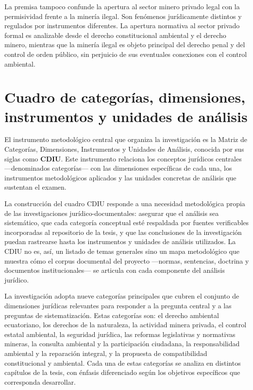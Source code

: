 La premisa tampoco confunde la apertura al sector minero privado legal con la permisividad frente a la minería ilegal. Son fenómenos jurídicamente distintos y regulados por instrumentos diferentes. La apertura normativa al sector privado formal es analizable desde el derecho constitucional ambiental y el derecho minero, mientras que la minería ilegal es objeto principal del derecho penal y del control de orden público, sin perjuicio de sus eventuales conexiones con el control ambiental.

\section{Cuadro de categorías, dimensiones, instrumentos
         y unidades de análisis}

El instrumento metodológico central que organiza la investigación es la Matriz de Categorías, Dimensiones, Instrumentos y Unidades de Análisis, conocida por sus siglas como \textbf{CDIU}. Este instrumento relaciona los conceptos jurídicos centrales ---denominados categorías--- con las dimensiones específicas de cada una, los instrumentos metodológicos aplicados y las unidades concretas de análisis que sustentan el examen.

La construcción del cuadro CDIU responde a una necesidad metodológica propia de las investigaciones jurídico-documentales: asegurar que el análisis sea sistemático, que cada categoría conceptual esté respaldada por fuentes verificables incorporadas al repositorio de la tesis, y que las conclusiones de la investigación puedan rastrearse hasta los instrumentos y unidades de análisis utilizados. La CDIU no es, así, un listado de temas generales sino un mapa metodológico que muestra cómo el corpus documental del proyecto ---normas, sentencias, doctrina y documentos institucionales--- se articula con cada componente del análisis jurídico.

La investigación adopta nueve categorías principales que cubren el conjunto de dimensiones jurídicas relevantes para responder a la pregunta central y a las preguntas de sistematización. Estas categorías son: el derecho ambiental ecuatoriano, los derechos de la naturaleza, la actividad minera privada, el control estatal ambiental, la seguridad jurídica, las reformas legislativas y normativas mineras, la consulta ambiental y la participación ciudadana, la responsabilidad ambiental y la reparación integral, y la propuesta de compatibilidad constitucional y ambiental. Cada una de estas categorías se analiza en distintos capítulos de la tesis, con énfasis diferenciado según los objetivos específicos que corresponda desarrollar.


